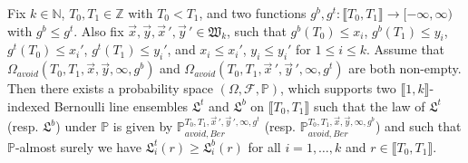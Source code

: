 \begin{lemma}
	Fix $k \in \mathbb{N}$, $T_0, T_1 \in \mathbb{Z}$ with $T_0 < T_1$, and two functions $g^b, g^t: \llbracket T_0, T_1 \rrbracket  \rightarrow [-\infty, \infty)$ with $g^b\leq g^t$. Also fix $\vec{x}, \vec{y}, \vec{x}\,', \vec{y}\,' \in \mathfrak{W}_k$, such that $g^b(T_0)\leq x_i$, $g^b(T_1)\leq y_i$, $g^t(T_0)\leq x_i'$, $g^t(T_1)\leq y_i'$, and $x_i\leq x_i'$, $y_i\leq y_i'$ for $1\leq i\leq k$. Assume that $\Omega_{avoid}(T_0, T_1, \vec{x}, \vec{y}, \infty,g^b)$ and $\Omega_{avoid}(T_0, T_1, \vec{x}\,', \vec{y}\,', \infty,g^t)$ are both non-empty. Then there exists a probability space $(\Omega, \mathcal{F}, \mathbb{P})$, which supports two $\llbracket 1, k \rrbracket$-indexed Bernoulli line ensembles $\mathfrak{L}^t$ and $\mathfrak{L}^b$ on $\llbracket T_0, T_1 \rrbracket$ such that the law of $\mathfrak{L}^{t}$ {\big (}resp. $\mathfrak{L}^b${\big )} under $\mathbb{P}$ is given by $\mathbb{P}_{avoid, Ber}^{T_0, T_1, \vec{x}\,', \vec{y}\,', \infty, g^t}$ {\big (}resp. $\mathbb{P}_{avoid, Ber}^{T_0, T_1, \vec{x}, \vec{y}, \infty, g^b}${\big )} and such that $\mathbb{P}$-almost surely we have $\mathfrak{L}_i^t(r) \geq \mathfrak{L}^b_i(r)$ for all $i = 1,\dots, k$ and $r \in \llbracket T_0, T_1 \rrbracket$.
\end{lemma}

